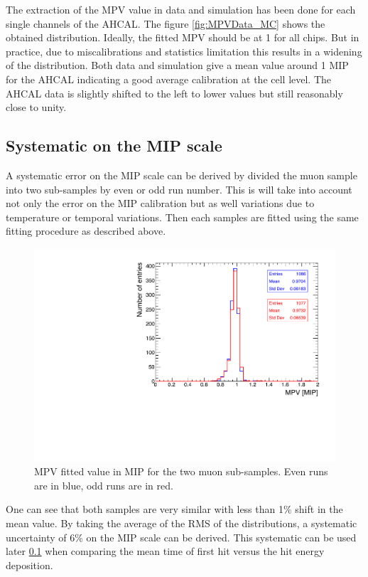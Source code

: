 The extraction of the MPV value in data and simulation has been done for each single channels of the AHCAL. The figure \ref{fig:MPVData_MC} shows the obtained distribution. Ideally, the fitted MPV should be at 1 for all chips. But in practice, due to miscalibrations and statistics limitation this results in a widening of the distribution. Both data and simulation give a mean value around 1 MIP for the AHCAL indicating a good average calibration at the cell level. The AHCAL data is slightly shifted to the left to lower values but still reasonably close to unity.

\subsection{Systematic on the MIP scale}

A systematic error on the MIP scale can be derived by divided the muon sample into two sub-samples by even or odd run number. This is will take into account not only the error on the MIP calibration but as well variations due to temperature or temporal variations. Then each samples are fitted using the same fitting procedure as described above.

\begin{figure}[htbp!]
	\centering
	\includegraphics[width=0.7\linewidth]{chap5/fig_EnergyCalib/SystematicMIP.pdf}
	\caption{MPV fitted value in MIP for the two muon sub-samples. Even runs are in blue, odd runs are in red.} \label{fig:MIPSyst}
\end{figure}

One can see that both samples are very similar with less than 1\% shift in the mean value. By taking the average of the RMS of the distributions, a systematic uncertainty of 6\% on the MIP scale can be derived. This systematic can be used later \ref{} when comparing the mean time of first hit versus the hit energy deposition.

